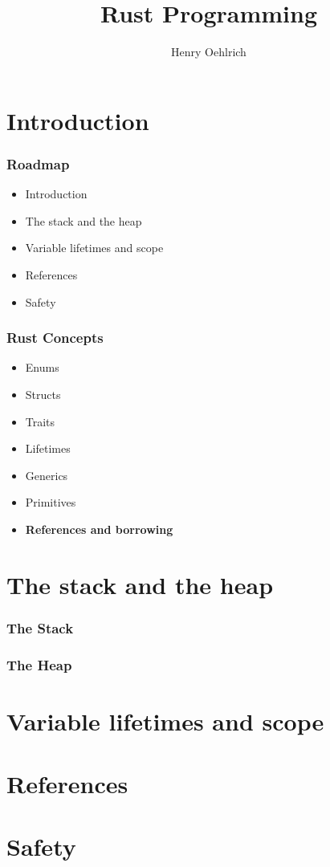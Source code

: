 \documentclass{beamer}
\title{Rust Programming}
\author{Henry Oehlrich}
\begin{document}
\maketitle{}

\section{Introduction}
\begin{frame}
	\frametitle{Roadmap}
	\begin{itemize}
        \item Introduction
        \item The stack and the heap
        \item Variable lifetimes and scope
        \item References
        \item Safety
	\end{itemize}
\end{frame}
\begin{frame}
    \frametitle{Rust Concepts}
    \begin{itemize}
        \item Enums
        \item Structs
        \item Traits
        \item Lifetimes
        \item Generics
        \item Primitives
        \item \textbf{References and borrowing}
    \end{itemize}
\end{frame}

\section{The stack and the heap}
\begin{frame}
    \frametitle{The Stack}
\end{frame}
\begin{frame}
    \frametitle{The Heap}
\end{frame}

\section{Variable lifetimes and scope}
\begin{frame}[fragile]
\end{frame}

\section{References}
\begin{frame}
\end{frame}

\section{Safety}
\begin{frame}
\end{frame}
\end{document}
